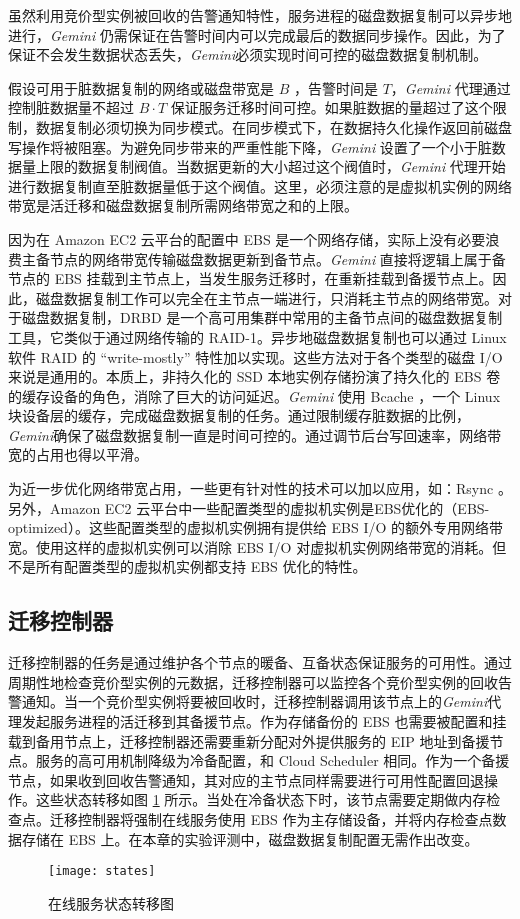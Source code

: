 虽然利用竞价型实例被回收的告警通知特性，服务进程的磁盘数据复制可以异步地进行，\emph{Gemini} 仍需保证在告警时间内可以完成最后的数据同步操作。因此，为了保证不会发生数据状态丢失，\emph{Gemini}必须实现时间可控的磁盘数据复制机制。

假设可用于脏数据复制的网络或磁盘带宽是 $B$ ，告警时间是 $T$，\emph{Gemini} 代理通过控制脏数据量不超过 $B \cdot T$ 保证服务迁移时间可控。如果脏数据的量超过了这个限制，数据复制必须切换为同步模式。在同步模式下，在数据持久化操作返回前磁盘写操作将被阻塞。为避免同步带来的严重性能下降，\emph{Gemini} 设置了一个小于脏数据量上限的数据复制阀值。当数据更新的大小超过这个阀值时，\emph{Gemini} 代理开始进行数据复制直至脏数据量低于这个阀值。这里，必须注意的是虚拟机实例的网络带宽是活迁移和磁盘数据复制所需网络带宽之和的上限。

因为在 Amazon EC2 云平台的配置中 EBS 是一个网络存储，实际上没有必要浪费主备节点的网络带宽传输磁盘数据更新到备节点。\emph{Gemini} 直接将逻辑上属于备节点的 EBS 挂载到主节点上，当发生服务迁移时，在重新挂载到备援节点上。因此，磁盘数据复制工作可以完全在主节点一端进行，只消耗主节点的网络带宽。对于磁盘数据复制，DRBD \cite{DRBD:2015} 是一个高可用集群中常用的主备节点间的磁盘数据复制工具，它类似于通过网络传输的 RAID-1。异步地磁盘数据复制也可以通过 Linux 软件 RAID \cite{Linux_md:2016} 的 ``write-mostly'' 特性加以实现。这些方法对于各个类型的磁盘 I/O 来说是通用的。本质上，非持久化的 SSD 本地实例存储扮演了持久化的 EBS 卷的缓存设备的角色，消除了巨大的访问延迟。\emph{Gemini} 使用 Bcache \cite{Bcache:2016}，一个 Linux 块设备层的缓存，完成磁盘数据复制的任务。通过限制缓存脏数据的比例，\emph{Gemini}确保了磁盘数据复制一直是时间可控的。通过调节后台写回速率，网络带宽的占用也得以平滑。

为近一步优化网络带宽占用，一些更有针对性的技术可以加以应用，如：Rsync \cite{Rsync:2016}。另外，Amazon EC2 云平台中一些配置类型的虚拟机实例是EBS优化的（EBS-optimized）。这些配置类型的虚拟机实例拥有提供给 EBS I/O 的额外专用网络带宽。使用这样的虚拟机实例可以消除 EBS I/O 对虚拟机实例网络带宽的消耗。但不是所有配置类型的虚拟机实例都支持 EBS 优化的特性。

\subsection{迁移控制器}
迁移控制器的任务是通过维护各个节点的暖备、互备状态保证服务的可用性。通过周期性地检查竞价型实例的元数据，迁移控制器可以监控各个竞价型实例的回收告警通知。当一个竞价型实例将要被回收时，迁移控制器调用该节点上的\emph{Gemini}代理发起服务进程的活迁移到其备援节点。作为存储备份的 EBS 也需要被配置和挂载到备用节点上，迁移控制器还需要重新分配对外提供服务的 EIP 地址到备援节点。服务的高可用机制降级为冷备配置，和 Cloud Scheduler \cite{He:2015:CCH:2749246.2749275} 相同。作为一个备援节点，如果收到回收告警通知，其对应的主节点同样需要进行可用性配置回退操作。这些状态转移如图 \ref{figure:states} 所示。当处在冷备状态下时，该节点需要定期做内存检查点。迁移控制器将强制在线服务使用 EBS 作为主存储设备，并将内存检查点数据存储在 EBS 上。在本章的实验评测中，磁盘数据复制配置无需作出改变。
\begin{figure}[]
  \centering
  \texttt{[image: states]}
  \caption{在线服务状态转移图}
  \label{figure:states}
\end{figure}

